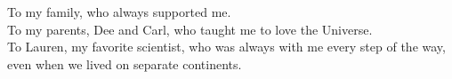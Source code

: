 To my family, who always supported me.\\
To my parents, Dee and Carl, who taught me to love the Universe.\\
To Lauren, my favorite scientist, who was always with me every step of the way, even when we lived on separate continents.
